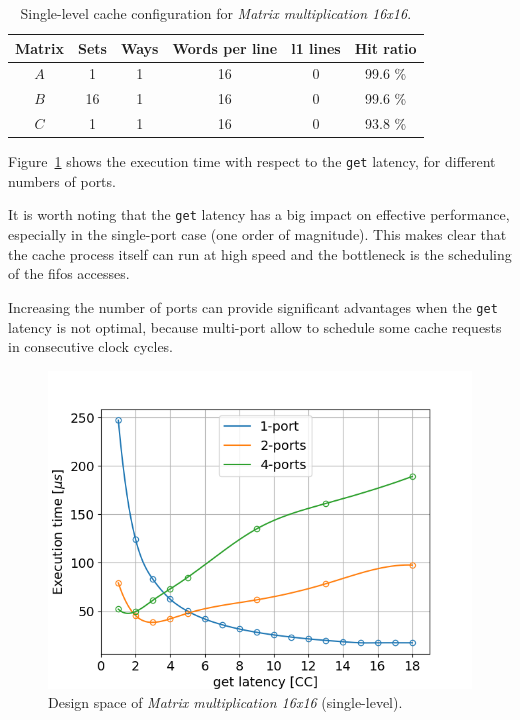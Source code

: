 \documentclass[11pt,a4paper,oneside]{memoir}
\begin{document}
\begin{table}[H]
	\begin{center}
		\begin{tabular}{cccccc}
			\hline
			\rowcolor{gray!50}
			\textbf{Matrix} &
			\textbf{Sets} & \textbf{Ways} & \textbf{Words per line} &
			\textbf{\ac{l1} lines} & \textbf{Hit ratio} \\
			\hline
			$A$ & 1 & 1 & 16 & 0 & 99.6 \% \\
			\rowcolor{gray!25}
			$B$ & 16 & 1 & 16 & 0 & 99.6 \% \\
			$C$ & 1 & 1 & 16 & 0 & 93.8 \% \\
			\hline
		\end{tabular}
	\end{center}
	\caption{Single-level cache configuration for \emph{Matrix
	multiplication 16x16}.}
	\label{tab:matmul_16_no_l1_config}
\end{table}

Figure~\ref{fig:matmul_16_no_l1_space} shows the execution time with respect to
the \texttt{get} latency, for different numbers of ports.

It is worth noting that the \texttt{get} latency has a big impact on effective
performance, especially in the single-port case (one order of magnitude).
This makes clear that the cache process itself can run at high speed and the
bottleneck is the scheduling of the \acp{fifo} accesses.

Increasing the number of ports can provide significant advantages when the
\texttt{get} latency is not optimal, because multi-port allow to schedule some
cache requests in consecutive clock cycles.

\begin{figure}[H]
	\centering
	\includegraphics[width=.7\textwidth]{matmul_16_multiport_latency}
	\caption{Design space of \emph{Matrix multiplication 16x16}
	(single-level).}
	\label{fig:matmul_16_no_l1_space}
\end{figure}
\end{document}
